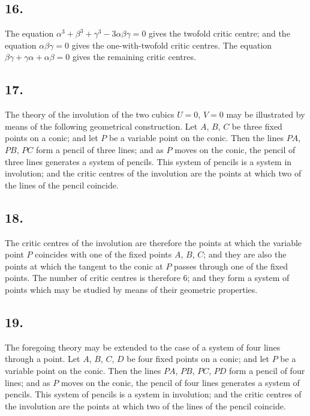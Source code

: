 \documentclass[11pt,a4paper]{article}
\theoremstyle{definition}
\begin{document}
\subsection*{16.}

The equation $\alpha^{3} + \beta^{3} + \gamma^{3} - 3\alpha\beta\gamma = 0$ gives the twofold critic centre; and the equation
$\alpha\beta\gamma = 0$ gives the one-with-twofold critic centres. The equation $\beta\gamma + \gamma\alpha + \alpha\beta = 0$
gives the remaining critic centres.

\newpage
\subsection*{17.}

The theory of the involution of the two cubics $U = 0$, $V = 0$ may be illustrated by
means of the following geometrical construction. Let $A$, $B$, $C$ be three fixed points on a
conic; and let $P$ be a variable point on the conic. Then the lines $PA$, $PB$, $PC$ form a
pencil of three lines; and as $P$ moves on the conic, the pencil of three lines generates a
system of pencils. This system of pencils is a system in involution; and the critic centres
of the involution are the points at which two of the lines of the pencil coincide.

\subsection*{18.}

The critic centres of the involution are therefore the points at which the variable point
$P$ coincides with one of the fixed points $A$, $B$, $C$; and they are also the points at which
the tangent to the conic at $P$ passes through one of the fixed points. The number of critic
centres is therefore 6; and they form a system of points which may be studied by means
of their geometric properties.

\newpage
\subsection*{19.}

The foregoing theory may be extended to the case of a system of four lines through a
point. Let $A$, $B$, $C$, $D$ be four fixed points on a conic; and let $P$ be a variable point on
the conic. Then the lines $PA$, $PB$, $PC$, $PD$ form a pencil of four lines; and as $P$ moves
on the conic, the pencil of four lines generates a system of pencils. This system of pencils
is a system in involution; and the critic centres of the involution are the points at which
two of the lines of the pencil coincide.
\end{document}
